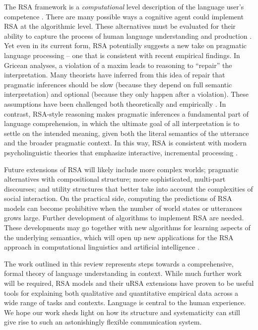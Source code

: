 \documentclass[]{elsarticle}
\begin{document}
The RSA framework is a \emph{computational} level description of the
language user's competence \citep{marr1982}. There are many
possible ways a cognitive agent could implement RSA at the algorithmic
level. These alternatives must be evaluated for their ability to capture
the process of human language understanding and production \citep{degen2015,nordmeyer2014}. Yet even in its
current form, RSA potentially suggests a new take on pragmatic language
processing -- one that is consistent with recent empirical
findings.
In Gricean analyses, a violation of a maxim leads to reasoning
to ``repair'' the interpretation. Many theorists have inferred from this
idea of repair that pragmatic inferences should be slow (because they
depend on full semantic interpretation) and optional (because they only
happen after a violation). These assumptions have been
challenged both theoretically and empirically \citep[e.g.,][]{levinson2000,grodner2010}. In contrast, RSA-style reasoning makes pragmatic inferences a fundamental part of language comprehension, in which the ultimate goal of all interpretation is to settle on the intended
meaning, given both the literal semantics of the utterance and the
broader pragmatic context. In this way, RSA is consistent with modern
psycholinguistic theories that emphasize interactive, incremental
processing \citep{degen2015}.


Future extensions of RSA will likely include more complex
worlds; pragmatic alternatives with compositional structure; more
sophisticated, multi-part discourses; and utility structures that better
take into account the complexities of social interaction. 
On the practical side, computing the predictions of RSA models can
become prohibitive when the number of world states or utterances grows
large. Further development of algorithms to implement RSA are needed.
These
developments may go together with new algorithms for learning aspects of
the underlying semantics, which will open up new applications for the
RSA approach in computational linguistics and artificial intelligence \citep{golland2010,vogel2013b,monroe2015,andreas2016}.

The work outlined in this review represents steps towards a
comprehensive, formal theory of language understanding in context. While
much further work will be required, RSA models and their uRSA extensions have
proven to be useful tools for explaining both qualitative and
quantitative empirical data across a wide range of tasks and contexts.
Language is central to the human experience. We hope our work sheds
light on how its structure and systematicity can still give rise to such
an astonishingly flexible communication system.
\end{document}
